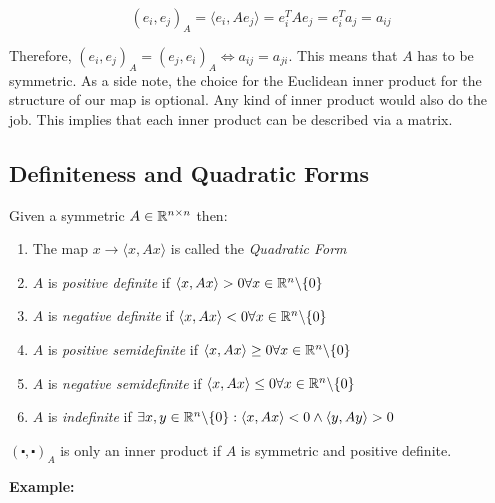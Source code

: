 \[
    (e_i, e_j)_A = \langle e_i, Ae_j\rangle = e_{i}^{T} A e_j = e_{i}^{T} a_j = a_{ij} 
\]

Therefore, \((e_i, e_j)_A = (e_j, e_i)_A \iff a_{ij} = a_{ji}\). This means that \(A\) has to be symmetric.
As a side note, the choice for the Euclidean inner product for the structure of our map is optional. Any
kind of inner product would also do the job. This implies that each inner product can be described via a 
matrix.

\subsection{Definiteness and Quadratic Forms}

Given a symmetric \(A \in \mathbb{R}^{n \times n}\) then:

\begin{enumerate}
    
    \item The map \(x \to \langle x, Ax\rangle\) is called the \emph{Quadratic Form}
    
    \item \(A\) is \emph{positive definite} if \(\langle x, Ax \rangle > 0 \forall x \in \mathbb{R}^n 
          \backslash \{0\}\)

    \item \(A\) is \emph{negative definite} if \(\langle x, Ax \rangle < 0 \forall x \in \mathbb{R}^n 
          \backslash \{0\}\)
    
    \item \(A\) is \emph{positive semidefinite} if \(\langle x, Ax \rangle \ge 0 \forall x \in \mathbb{R}^n 
          \backslash \{0\}\)

    \item \(A\) is \emph{negative semidefinite} if \(\langle x, Ax \rangle \le 0 \forall x \in \mathbb{R}^n 
          \backslash \{0\}\)

    \item \(A\) is \emph{indefinite} if \(\exists x,y \in \mathbb{R}^n  \backslash \{0\}: \langle x, Ax\rangle 
          < 0 \land \langle y, Ay \rangle > 0 \)
    
\end{enumerate}

\((\centerdot , \centerdot)_A\) is only an inner product if \(A\) is symmetric and positive definite.
\vspace{\baselineskip}

\textbf{Example:}
\vspace{\baselineskip}

